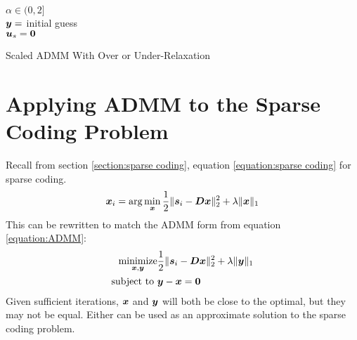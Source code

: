 \begin{algorithm}[H]
\SetAlgoLined
   $\alpha \in (0,2]$ \\
   $\bm{y} = $ initial guess \\
   $\bm{u}_s = \bm{0}$ \\
 \caption{Scaled ADMM With Over or Under-Relaxation}
\end{algorithm}


\section{Applying ADMM to the Sparse Coding Problem}
\label{section:Applying ADMM}
Recall from section \ref{section:sparse coding}, equation \ref{equation:sparse coding} for sparse coding.
%
\begin{equation}
\bm{x}_i = \arg\min_{\bm{x}} \frac{1}{2}\|\bm{s}_i - \bm{D}\bm{x}\|_2^2 + \lambda \|\bm{x}\|_1
\end{equation}
%
This can be rewritten to match the ADMM form from equation \ref{equation:ADMM}:
\begin{equation} \label{equation:SC Opt Prob}
\begin{aligned}
\operatorname*{\text{minimize}}_{\bm{x},\bm{y}} & \frac{1}{2} \|\bm{s}_i - \bm{D}\bm{x}\|_2^2 + \lambda\|\bm{y}\|_1 \\
         \text{subject to } & \bm{y} - \bm{x} = \bm{0}
\end{aligned}
\end{equation}
%
Given sufficient iterations, $\bm{x}$ and $\bm{y}$ will both be close to the optimal, but they may not be equal. Either can be used as an approximate solution to the sparse coding problem.

